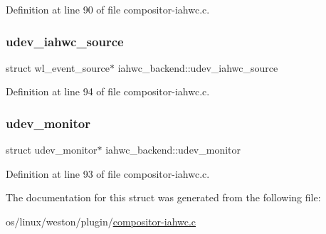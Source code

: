 Definition at line 90 of file compositor-\/iahwc.\+c.

\mbox{\label{structiahwc__backend_aa0eec87be32613771a08de5b9db049ed}} 
\subsubsection{\texorpdfstring{udev\+\_\+iahwc\+\_\+source}{udev\_iahwc\_source}}
{\footnotesize\ttfamily struct wl\+\_\+event\+\_\+source$\ast$ iahwc\+\_\+backend\+::udev\+\_\+iahwc\+\_\+source}



Definition at line 94 of file compositor-\/iahwc.\+c.

\mbox{\label{structiahwc__backend_ac719de9c1f60ef6a7467146430f5f017}} 
\subsubsection{\texorpdfstring{udev\+\_\+monitor}{udev\_monitor}}
{\footnotesize\ttfamily struct udev\+\_\+monitor$\ast$ iahwc\+\_\+backend\+::udev\+\_\+monitor}



Definition at line 93 of file compositor-\/iahwc.\+c.



The documentation for this struct was generated from the following file\+:\begin{DoxyCompactItemize}
\item 
os/linux/weston/plugin/\mbox{\hyperlink{compositor-iahwc_8c}{compositor-\/iahwc.\+c}}\end{DoxyCompactItemize}

